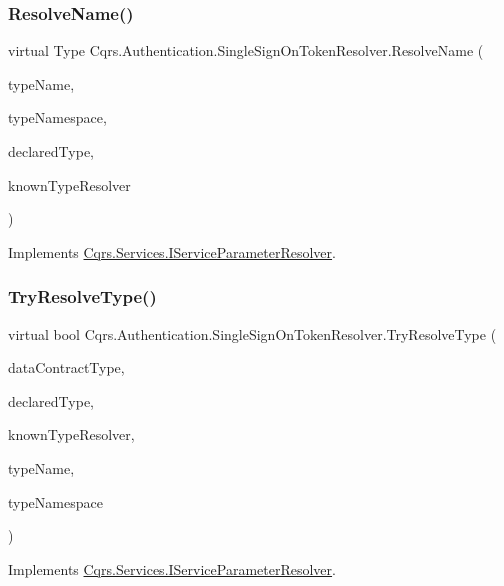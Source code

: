 \subsubsection{\texorpdfstring{Resolve\+Name()}{ResolveName()}}
{\footnotesize\ttfamily virtual Type Cqrs.\+Authentication.\+Single\+Sign\+On\+Token\+Resolver.\+Resolve\+Name (\begin{DoxyParamCaption}\item[{string}]{type\+Name,  }\item[{string}]{type\+Namespace,  }\item[{Type}]{declared\+Type,  }\item[{Data\+Contract\+Resolver}]{known\+Type\+Resolver }\end{DoxyParamCaption})\hspace{0.3cm}{\ttfamily [virtual]}}



Implements \hyperlink{interfaceCqrs_1_1Services_1_1IServiceParameterResolver_a37c4b53616192e4e2f15ab4661ab99ae}{Cqrs.\+Services.\+I\+Service\+Parameter\+Resolver}.

\mbox{\label{classCqrs_1_1Authentication_1_1SingleSignOnTokenResolver_af474315b8fc66d17d64460fab8c63dd1}} 
\subsubsection{\texorpdfstring{Try\+Resolve\+Type()}{TryResolveType()}}
{\footnotesize\ttfamily virtual bool Cqrs.\+Authentication.\+Single\+Sign\+On\+Token\+Resolver.\+Try\+Resolve\+Type (\begin{DoxyParamCaption}\item[{Type}]{data\+Contract\+Type,  }\item[{Type}]{declared\+Type,  }\item[{Data\+Contract\+Resolver}]{known\+Type\+Resolver,  }\item[{out Xml\+Dictionary\+String}]{type\+Name,  }\item[{out Xml\+Dictionary\+String}]{type\+Namespace }\end{DoxyParamCaption})\hspace{0.3cm}{\ttfamily [virtual]}}



Implements \hyperlink{interfaceCqrs_1_1Services_1_1IServiceParameterResolver_a31c82a00b192b877faff6df99e1b689b}{Cqrs.\+Services.\+I\+Service\+Parameter\+Resolver}.

